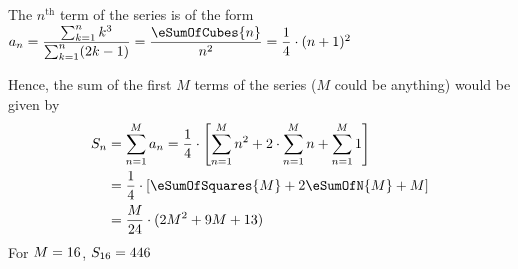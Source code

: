 \begin{solution}[\halfpage]
	The $n^{\text{th}}$ term of the series is of the form $a_n = \dfrac{\sum_{k=1}^{n}k^3}{\sum_{k=1}^{n}(2k-1)}
	= \dfrac{\eSumOfCubes{n}}{n^2} = \dfrac{1}{4}\cdot(n+1)^2$
	
	Hence, the sum of the first $M$ terms of the series ($M$ could be anything) would be given by 
	\begin{align}
		S_n &= \sum_{n=1}^{M}a_n = \dfrac{1}{4}\cdot\left[ \sum_{n=1}^{M}n^2 + 2\cdot\sum_{n=1}^{M}n + \sum_{n=1}^{M}1 \right] \\
		&= \dfrac{1}{4}\cdot\left[ \eSumOfSquares{M} + 2\eSumOfN{M} + M \right] \\ 
		&= \dfrac{M}{24}\cdot(2M^2 + 9M + 13)
	\end{align}
	For $M=16$, $S_{16} = 446$
\end{solution}
